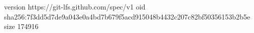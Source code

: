 version https://git-lfs.github.com/spec/v1
oid sha256:7f3dd5d7de9a043e0a4bd7b679f5acd915048b4432c207c82bf50356153b2b5e
size 174916
